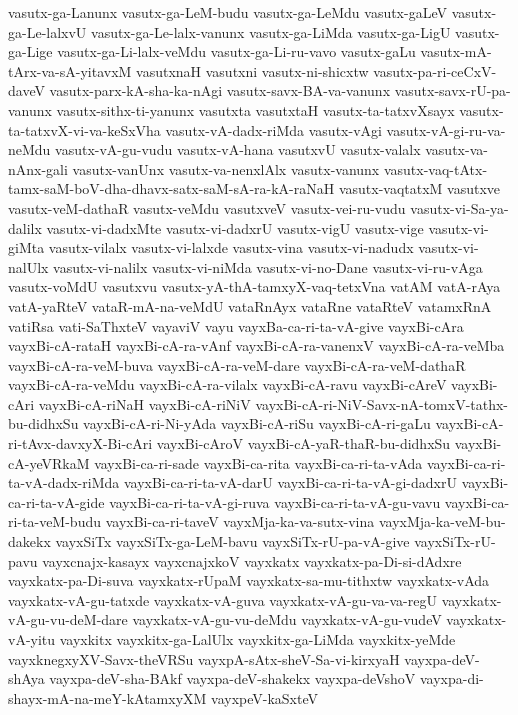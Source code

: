 {vasutx-ga-Lanunx
vasutx-ga-LeM-budu
vasutx-ga-LeMdu
vasutx-gaLeV
vasutx-ga-Le-lalxvU
vasutx-ga-Le-lalx-vanunx
vasutx-ga-LiMda
vasutx-ga-LigU
vasutx-ga-Lige
vasutx-ga-Li-lalx-veMdu
vasutx-ga-Li-ru-vavo
vasutx-gaLu
vasutx-mA-tArx-va-sA-yitavxM
vasutxnaH
vasutxni
vasutx-ni-shicxtw
vasutx-pa-ri-ceCxV-daveV
vasutx-parx-kA-sha-ka-nAgi
vasutx-savx-BA-va-vanunx
vasutx-savx-rU-pa-vanunx
vasutx-sithx-ti-yanunx
vasutxta
vasutxtaH
vasutx-ta-tatxvXsayx
vasutx-ta-tatxvX-vi-va-keSxVha
vasutx-vA-dadx-riMda
vasutx-vAgi
vasutx-vA-gi-ru-va-neMdu
vasutx-vA-gu-vudu
vasutx-vA-hana
vasutxvU
vasutx-valalx
vasutx-va-nAnx-gali
vasutx-vanUnx
vasutx-va-nenxlAlx
vasutx-vanunx
vasutx-vaq-tAtx-tamx-saM-boV-dha-dhavx-satx-saM-sA-ra-kA-raNaH
vasutx-vaqtatxM
vasutxve
vasutx-veM-dathaR
vasutx-veMdu
vasutxveV
vasutx-vei-ru-vudu
vasutx-vi-Sa-ya-dalilx
vasutx-vi-dadxMte
vasutx-vi-dadxrU
vasutx-vigU
vasutx-vige
vasutx-vi-giMta
vasutx-vilalx
vasutx-vi-lalxde
vasutx-vina
vasutx-vi-nadudx
vasutx-vi-nalUlx
vasutx-vi-nalilx
vasutx-vi-niMda
vasutx-vi-no-Dane
vasutx-vi-ru-vAga
vasutx-voMdU
vasutxvu
vasutx-yA-thA-tamxyX-vaq-tetxVna
vatAM
vatA-rAya
vatA-yaRteV
vataR-mA-na-veMdU
vataRnAyx
vataRne
vataRteV
vatamxRnA
vatiRsa
vati-SaThxteV
vayaviV
vayu
vayxBa-ca-ri-ta-vA-give
vayxBi-cAra
vayxBi-cA-rataH
vayxBi-cA-ra-vAnf
vayxBi-cA-ra-vanenxV
vayxBi-cA-ra-veMba
vayxBi-cA-ra-veM-buva
vayxBi-cA-ra-veM-dare
vayxBi-cA-ra-veM-dathaR
vayxBi-cA-ra-veMdu
vayxBi-cA-ra-vilalx
vayxBi-cA-ravu
vayxBi-cAreV
vayxBi-cAri
vayxBi-cA-riNaH
vayxBi-cA-riNiV
vayxBi-cA-ri-NiV-Savx-nA-tomxV-tathx-bu-didhxSu
vayxBi-cA-ri-Ni-yAda
vayxBi-cA-riSu
vayxBi-cA-ri-gaLu
vayxBi-cA-ri-tAvx-davxyX-Bi-cAri
vayxBi-cAroV
vayxBi-cA-yaR-thaR-bu-didhxSu
vayxBi-cA-yeVRkaM
vayxBi-ca-ri-sade
vayxBi-ca-rita
vayxBi-ca-ri-ta-vAda
vayxBi-ca-ri-ta-vA-dadx-riMda
vayxBi-ca-ri-ta-vA-darU
vayxBi-ca-ri-ta-vA-gi-dadxrU
vayxBi-ca-ri-ta-vA-gide
vayxBi-ca-ri-ta-vA-gi-ruva
vayxBi-ca-ri-ta-vA-gu-vavu
vayxBi-ca-ri-ta-veM-budu
vayxBi-ca-ri-taveV
vayxMja-ka-va-sutx-vina
vayxMja-ka-veM-bu-dakekx
vayxSiTx
vayxSiTx-ga-LeM-bavu
vayxSiTx-rU-pa-vA-give
vayxSiTx-rU-pavu
vayxcnajx-kasayx
vayxcnajxkoV
vayxkatx
vayxkatx-pa-Di-si-dAdxre
vayxkatx-pa-Di-suva
vayxkatx-rUpaM
vayxkatx-sa-mu-tithxtw
vayxkatx-vAda
vayxkatx-vA-gu-tatxde
vayxkatx-vA-guva
vayxkatx-vA-gu-va-va-regU
vayxkatx-vA-gu-vu-deM-dare
vayxkatx-vA-gu-vu-deMdu
vayxkatx-vA-gu-vudeV
vayxkatx-vA-yitu
vayxkitx
vayxkitx-ga-LalUlx
vayxkitx-ga-LiMda
vayxkitx-yeMde
vayxknegxyXV-Savx-theVRSu
vayxpA-sAtx-sheV-Sa-vi-kirxyaH
vayxpa-deV-shAya
vayxpa-deV-sha-BAkf
vayxpa-deV-shakekx
vayxpa-deVshoV
vayxpa-di-shayx-mA-na-meY-kAtamxyXM
vayxpeV-kaSxteV
}
